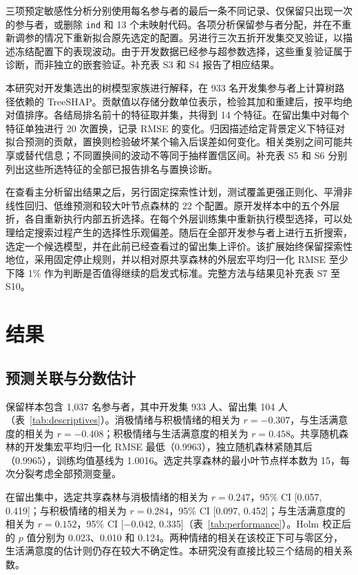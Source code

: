 三项预定敏感性分析分别使用每名参与者的最后一条不同记录、仅保留只出现一次的参与者，或删除 \texttt{ind} 和 13 个未映射代码。各项分析保留参与者分配，并在不重新调参的情况下重新拟合原先选定的配置。另进行三次五折开发集交叉验证，以描述冻结配置下的表现波动。由于开发数据已经参与超参数选择，这些重复验证属于诊断，而非独立的嵌套验证。补充表 S3 和 S4 报告了相应结果。

本研究对开发集选出的树模型家族进行解释，在 933 名开发集参与者上计算树路径依赖的 TreeSHAP\citep{lundberg2020}。贡献值以存储分数单位表示，检验其加和重建后，按平均绝对值排序。各结局排名前十的特征取并集，共得到 14 个特征。在留出集中对每个特征单独进行 20 次置换，记录 RMSE 的变化。归因描述给定背景定义下特征对拟合预测的贡献，置换则检验破坏某个输入后误差如何变化。相关类别之间可能共享或替代信息；不同置换间的波动不等同于抽样置信区间。补充表 S5 和 S6 分别列出这些所选特征的全部已报告排名与置换诊断。

在查看主分析留出结果之后，另行固定探索性计划，测试覆盖更强正则化、平滑非线性回归、低维预测和较大叶节点森林的 22 个配置。原开发样本中的五个外层折，各自重新执行内部五折选择。在每个外层训练集中重新执行模型选择，可以处理给定搜索过程产生的选择性乐观偏差\citep{cawley2010}。随后在全部开发参与者上进行五折搜索，选定一个候选模型，并在此前已经查看过的留出集上评价。该扩展始终保留探索性地位，采用固定停止规则，并以相对原共享森林的外层宏平均归一化 RMSE 至少下降 1\% 作为判断是否值得继续的启发式标准。完整方法与结果见补充表 S7 至 S10。

\section{结果}
\subsection{预测关联与分数估计}
保留样本包含 1,037 名参与者，其中开发集 933 人、留出集 104 人（表~\ref{tab:descriptives}）。消极情绪与积极情绪的相关为 $r=-0.307$，与生活满意度的相关为 $r=-0.408$；积极情绪与生活满意度的相关为 $r=0.458$。共享随机森林的开发集宏平均归一化 RMSE 最低（0.9963），独立随机森林紧随其后（0.9965），训练均值基线为 1.0016。选定共享森林的最小叶节点样本数为 15，每次分裂考虑全部预测变量。



在留出集中，选定共享森林与消极情绪的相关为 $r=0.247$，95\% CI [0.057, 0.419]；与积极情绪的相关为 $r=0.284$，95\% CI [0.097, 0.452]；与生活满意度的相关为 $r=0.152$，95\% CI [$-0.042$, 0.335]（表~\ref{tab:performance}）。Holm 校正后的 $p$ 值分别为 0.023、0.010 和 0.124。两种情绪的相关在该校正下可与零区分，生活满意度的估计则仍存在较大不确定性。本研究没有直接比较三个结局的相关系数。

